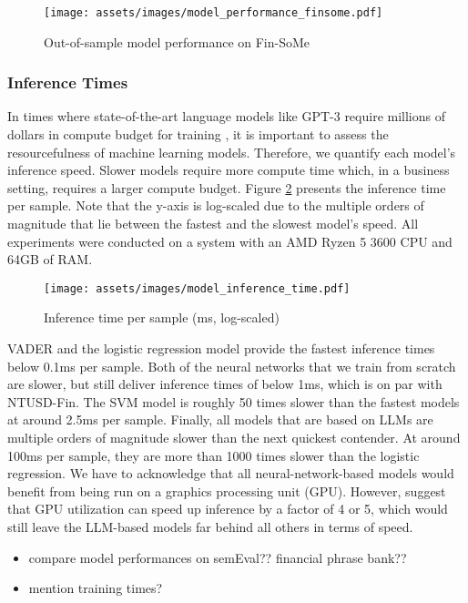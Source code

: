 \begin{figure}[!ht]
	\texttt{[image: assets/images/model\_performance\_finsome.pdf]}	
	\caption{Out-of-sample model performance on Fin-SoMe}
	\label{figure-model-performance-stocktwits}
\end{figure}



\subsubsection{Inference Times}
In times where state-of-the-art language models like GPT-3 require millions of dollars in compute budget for training \cite{gpt3-cost}, it is important to assess the resourcefulness of machine learning models. Therefore, we quantify each model's inference speed. Slower models require more compute time which, in a business setting, requires a larger compute budget. Figure \ref{figure-model-inference-times} presents the inference time per sample. Note that the y-axis is log-scaled due to the multiple orders of magnitude that lie between the fastest and the slowest model's speed. All experiments were conducted on a system with an AMD Ryzen 5 3600 CPU and 64GB of RAM.

\begin{figure}[!ht]
	\texttt{[image: assets/images/model\_inference\_time.pdf]}	
	\caption{Inference time per sample (ms, log-scaled)}
	\label{figure-model-inference-times}
\end{figure}

VADER and the logistic regression model provide the fastest inference times below 0.1ms per sample. Both of the neural networks that we train from scratch are slower, but still deliver inference times of below 1ms, which is on par with NTUSD-Fin. The SVM model is roughly 50 times slower than the fastest models at around 2.5ms per sample. Finally, all models that are based on LLMs are multiple orders of magnitude slower than the next quickest contender. At around 100ms per sample, they are more than 1000 times slower than the logistic regression. We have to acknowledge that all neural-network-based models would benefit from being run on a graphics processing unit (GPU). However,  suggest that GPU utilization can speed up inference by a factor of 4 or 5, which would still leave the LLM-based models far behind all others in terms of speed.

\begin{itemize}[noitemsep]
	\item compare model performances on semEval?? financial phrase bank??
	\item mention training times?
\end{itemize}
